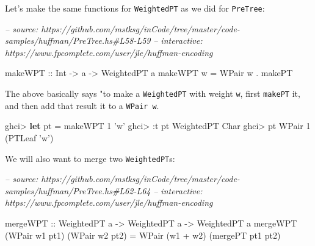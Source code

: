 \documentclass[]{article}
\newenvironment{Shaded}{}{}
\newcommand{\CharTok}[1]{\textcolor[rgb]{0.25,0.44,0.63}{#1}}
\newcommand{\CommentTok}[1]{\textcolor[rgb]{0.38,0.63,0.69}{\textit{#1}}}
\newcommand{\DataTypeTok}[1]{\textcolor[rgb]{0.56,0.13,0.00}{#1}}
\newcommand{\DecValTok}[1]{\textcolor[rgb]{0.25,0.63,0.44}{#1}}
\newcommand{\FunctionTok}[1]{\textcolor[rgb]{0.02,0.16,0.49}{#1}}
\newcommand{\KeywordTok}[1]{\textcolor[rgb]{0.00,0.44,0.13}{\textbf{#1}}}
\newcommand{\NormalTok}[1]{#1}
\newcommand{\OtherTok}[1]{\textcolor[rgb]{0.00,0.44,0.13}{#1}}
\begin{document}
Let's make the same functions for \texttt{WeightedPT} as we did for
\texttt{PreTree}:

\begin{Shaded}
\begin{Highlighting}[]
\CommentTok{-- source: https://github.com/mstksg/inCode/tree/master/code-samples/huffman/PreTree.hs#L58-L59}
\CommentTok{-- interactive: https://www.fpcomplete.com/user/jle/huffman-encoding}

\OtherTok{makeWPT ::} \DataTypeTok{Int} \OtherTok{->}\NormalTok{ a }\OtherTok{->} \DataTypeTok{WeightedPT}\NormalTok{ a}
\NormalTok{makeWPT w }\FunctionTok{=} \DataTypeTok{WPair}\NormalTok{ w }\FunctionTok{.}\NormalTok{ makePT}
\end{Highlighting}
\end{Shaded}

The above basically says "to make a \texttt{WeightedPT} with weight \texttt{w},
first \texttt{makePT} it, and then add that result it to a \texttt{WPair\ w}.

\begin{Shaded}
\begin{Highlighting}[]
\NormalTok{ghci}\FunctionTok{>} \KeywordTok{let}\NormalTok{ pt }\FunctionTok{=}\NormalTok{ makeWPT }\DecValTok{1} \CharTok{'w'}
\NormalTok{ghci}\FunctionTok{>} \FunctionTok{:}\NormalTok{t pt}
\DataTypeTok{WeightedPT} \DataTypeTok{Char}
\NormalTok{ghci}\FunctionTok{>}\NormalTok{ pt}
\DataTypeTok{WPair} \DecValTok{1}\NormalTok{ (}\DataTypeTok{PTLeaf} \CharTok{'w'}\NormalTok{)}
\end{Highlighting}
\end{Shaded}

We will also want to merge two \texttt{WeightedPT}s:

\begin{Shaded}
\begin{Highlighting}[]
\CommentTok{-- source: https://github.com/mstksg/inCode/tree/master/code-samples/huffman/PreTree.hs#L62-L64}
\CommentTok{-- interactive: https://www.fpcomplete.com/user/jle/huffman-encoding}

\OtherTok{mergeWPT ::} \DataTypeTok{WeightedPT}\NormalTok{ a }\OtherTok{->} \DataTypeTok{WeightedPT}\NormalTok{ a }\OtherTok{->} \DataTypeTok{WeightedPT}\NormalTok{ a}
\NormalTok{mergeWPT (}\DataTypeTok{WPair}\NormalTok{ w1 pt1) (}\DataTypeTok{WPair}\NormalTok{ w2 pt2)}
    \FunctionTok{=} \DataTypeTok{WPair}\NormalTok{ (w1 }\FunctionTok{+}\NormalTok{ w2) (mergePT pt1 pt2)}
\end{Highlighting}
\end{Shaded}
\end{document}
